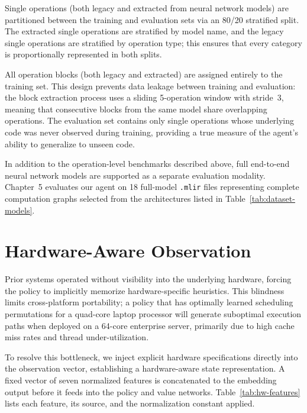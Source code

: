 Single operations (both legacy and extracted from neural network models) are partitioned between the training and evaluation sets via an 80/20 stratified split. The extracted single operations are stratified by model name, and the legacy single operations are stratified by operation type; this ensures that every category is proportionally represented in both splits.

All operation blocks (both legacy and extracted) are assigned entirely to the training set. This design prevents data leakage between training and evaluation: the block extraction process uses a sliding 5-operation window with stride~3, meaning that consecutive blocks from the same model share overlapping operations. The evaluation set contains only single operations whose underlying code was never observed during training, providing a true measure of the agent's ability to generalize to unseen code.

In addition to the operation-level benchmarks described above, full end-to-end neural network models are supported as a separate evaluation modality. Chapter~5 evaluates our agent on 18 full-model \texttt{.mlir} files representing complete computation graphs selected from the architectures listed in Table~\ref{tab:dataset-models}.

\section{Hardware-Aware Observation}
Prior systems operated without visibility into the underlying hardware, forcing the policy to implicitly memorize hardware-specific heuristics. This blindness limits cross-platform portability; a policy that has optimally learned scheduling permutations for a quad-core laptop processor will generate suboptimal execution paths when deployed on a 64-core enterprise server, primarily due to high cache miss rates and thread under-utilization.

To resolve this bottleneck, we inject explicit hardware specifications directly into the observation vector, establishing a hardware-aware state representation. A fixed vector of seven normalized features is concatenated to the embedding output before it feeds into the policy and value networks. Table~\ref{tab:hw-features} lists each feature, its source, and the normalization constant applied.

